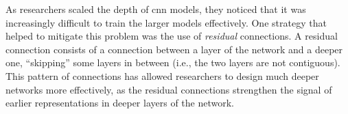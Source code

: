 
As researchers scaled the depth of \gls{cnn} models, they
noticed that it was increasingly difficult to train the
larger models effectively. One strategy that helped to
mitigate this problem was the use of \emph{residual}
connections. A residual connection consists of a connection
between a layer of the network and a deeper one,
``skipping'' some layers in between (i.e., the two layers
are not contiguous). This pattern of connections has allowed
researchers to design much deeper networks more effectively,
as the residual connections strengthen the signal of earlier
representations in deeper layers of the network.